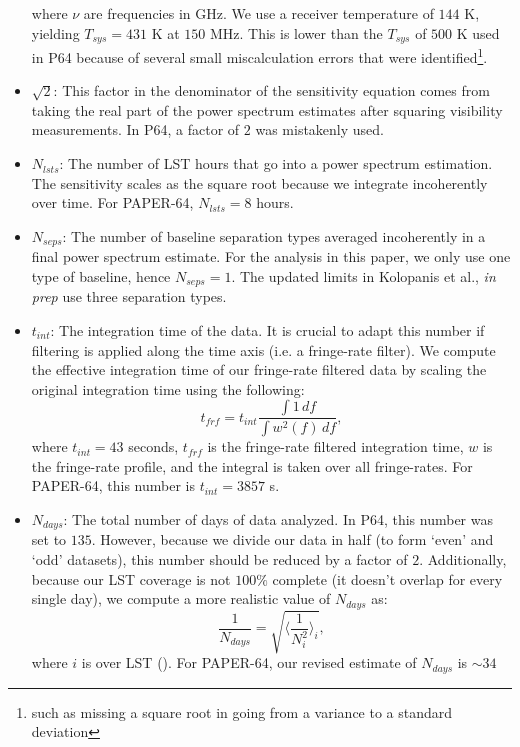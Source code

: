 \documentclass[preprint2,numberedappendix,tighten]{aastex6}  %
\begin{document}
\begin{itemize}
where $\nu$ are frequencies in GHz. We use a receiver temperature of $144$ K, yielding $T_{sys} = 431$ K at $150$ MHz. 
This is lower than the $T_{sys}$ of $500$ K used in P64 because of several small miscalculation errors that were 
identified\footnote{such as missing a square root in going from a variance to a standard deviation}.
\item $\sqrt{2}$: This factor in the denominator of the sensitivity equation comes from taking the real part of the power spectrum 
estimates after squaring visibility measurements. In P64, a factor of $2$ was mistakenly used.
\item $N_{lsts}$: The number of LST hours that go into a power spectrum estimation. The sensitivity scales as the square root 
because we integrate incoherently over time. For PAPER-64, $N_{lsts} = 8$ hours.
\item $N_{seps}$: The number of baseline separation types averaged incoherently in a final power spectrum estimate. For the 
analysis in this paper, we only use one type of baseline, hence $N_{seps}=1$. The updated limits in Kolopanis et al., \textit{in prep}
use three separation types.
\item $t_{int}$: The integration time of the data. It is crucial to adapt this number if filtering is applied along the time axis (i.e. a 
fringe-rate filter). We compute the effective integration time of our fringe-rate filtered data by scaling the original integration time 
using the following:
\begin{equation}
t_{frf} = t_{int} \frac{\int1 \, df}{\int w^{2}(f) \,df},
\end{equation}
where $t_{int}=43$ seconds, $t_{frf}$ is the fringe-rate filtered integration time, $w$ is the fringe-rate profile, and the integral is 
taken over all fringe-rates. For PAPER-64, this number is $t_{int} = 3857$ s. 
\item $N_{days}$: The total number of days of data analyzed. In P64, this number was set to $135$. However, because we 
divide our data in half (to form `even' and `odd' datasets), this number should be reduced by a factor of $2$. Additionally, 
because our LST coverage is not $100\%$ complete (it doesn't overlap for every single day), we compute a more realistic value of 
$N_{days}$ as:
\begin{equation}
 \frac{1}{N_{days}} = \sqrt{\Big\langle\frac{1}{N_{i}^{2}} \Big\rangle_{i}},
 \end{equation}
\noindent where $i$ is over LST (\citealt{jacobs_et_al2015}). For PAPER-64, our revised estimate of $N_{days}$ is $\sim34$ 

\end{itemize}
\end{document}
